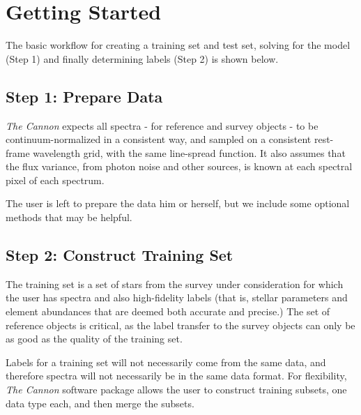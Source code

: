 \documentclass[letterpaper,10pt,english]{sphinxmanual}
\begin{document}
\chapter{Getting Started}
\label{index:getting-started}
The basic workflow for creating a training set and test set, solving for
the model (Step 1) and finally determining labels (Step 2) is shown below.


\section{Step 1: Prepare Data}
\label{index:step-1-prepare-data}
\emph{The Cannon} expects all spectra - for reference and survey objects -
to be continuum-normalized in a consistent way, and sampled on a consistent
rest-frame wavelength grid, with the same line-spread function. It also
assumes that the flux variance, from photon noise and other sources, is
known at each spectral pixel of each spectrum.

The user is left to prepare the data him or herself, but we include
some optional methods that may be helpful.


\section{Step 2: Construct Training Set}
\label{index:step-2-construct-training-set}
The training set is a set of stars from the survey under consideration
for which the user has spectra and also high-fidelity labels (that is,
stellar parameters and element abundances that are deemed both accurate
and precise.) The set of reference objects is critical, as the label
transfer to the survey objects can only be as good as the quality of the
training set.

Labels for a training set will not necessarily come from the same data,
and therefore spectra will not necessarily be in the same data format.
For flexibility, \emph{The Cannon} software package allows the user to construct
training subsets, one data type each, and then merge the subsets.
\end{document}
